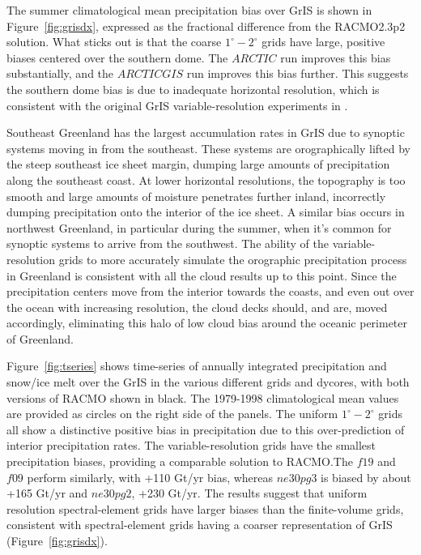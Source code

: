 \documentclass[draft]{agujournal2019}
\begin{document}
The summer climatological mean precipitation bias over GrIS is shown in Figure~\ref{fig:grisdx}, expressed as the fractional difference from the RACMO2.3p2 solution. What sticks out is that the coarse $1^{\circ}-2^{\circ}$ grids have large, positive biases centered over the southern dome. The $ARCTIC$ run improves this bias substantially, and the $ARCTICGIS$ run improves this bias further. This suggests the southern dome bias is due to inadequate horizontal resolution, which is consistent with the original GrIS variable-resolution experiments in \cite{VETAL2018TC}. 

Southeast Greenland has the largest accumulation rates in GrIS due to synoptic systems moving in from the southeast. These systems are orographically lifted by the steep southeast ice sheet margin, dumping large amounts of precipitation along the southeast coast. At lower horizontal resolutions, the topography is too smooth and large amounts of moisture penetrates further inland, incorrectly dumping precipitation onto the interior of the ice sheet. A similar bias occurs in northwest Greenland, in particular during the summer, when it's common for synoptic systems to arrive from the southwest. The ability of the variable-resolution grids to more accurately simulate the orographic precipitation process in Greenland is consistent with all the cloud results up to this point. Since the precipitation centers move from the interior towards the coasts, and even out over the ocean with increasing resolution, the cloud decks should, and are, moved accordingly, eliminating this halo of low cloud bias around the oceanic perimeter of Greenland.

Figure~\ref{fig:tseries} shows time-series of annually integrated precipitation and snow/ice melt over the GrIS in the various different grids and dycores, with both versions of RACMO shown in black. The 1979-1998 climatological mean values are provided as circles on the right side of the panels. The uniform $1^{\circ}-2^{\circ}$ grids all show a distinctive positive bias in precipitation due to this over-prediction of interior precipitation rates. The  variable-resolution grids have the smallest precipitation biases, providing a comparable solution to RACMO.The $f19$ and $f09$ perform similarly, with +110 Gt/yr bias, whereas $ne30pg3$ is biased by about +165 Gt/yr and $ne30pg2$, +230 Gt/yr. The results suggest that uniform resolution spectral-element grids have larger biases than the finite-volume grids, consistent with spectral-element grids having a coarser representation of GrIS (Figure~\ref{fig:grisdx}).
\end{document}
